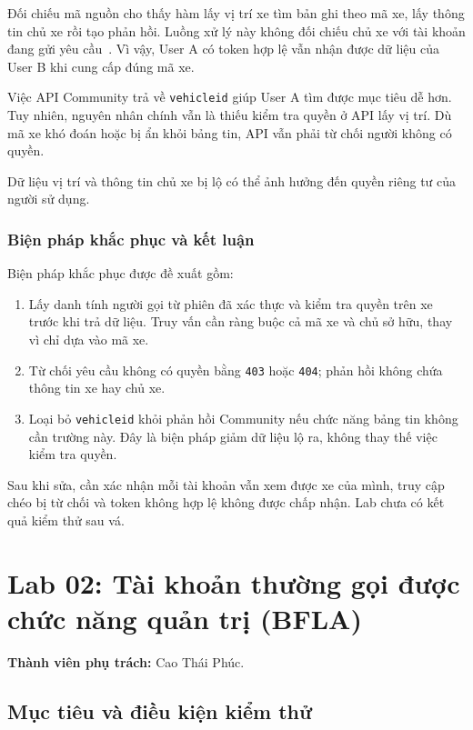 \documentclass[oneside,a4paper,12pt]{extreport}
\begin{document}
Đối chiếu mã nguồn cho thấy hàm lấy vị trí xe tìm bản ghi theo mã xe,
lấy thông tin chủ xe rồi tạo phản hồi. Luồng xử lý này không đối chiếu
chủ xe với tài khoản đang gửi yêu cầu~\cite{crapi-vehicle}. Vì vậy, User A có token hợp lệ
vẫn nhận được dữ liệu của User B khi cung cấp đúng mã xe.

Việc API Community trả về \texttt{vehicleid} giúp User A tìm được mục
tiêu dễ hơn. Tuy nhiên, nguyên nhân chính vẫn là thiếu kiểm tra quyền
ở API lấy vị trí. Dù mã xe khó đoán hoặc bị ẩn khỏi bảng tin, API vẫn
phải từ chối người không có quyền.

Dữ liệu vị trí và thông tin chủ xe bị lộ có thể ảnh hưởng đến quyền
riêng tư của người sử dụng.

\subsubsection{Biện pháp khắc phục và kết luận}

Biện pháp khắc phục được đề xuất gồm:
\begin{enumerate}
    \item Lấy danh tính người gọi từ phiên đã xác thực và kiểm tra quyền
    trên xe trước khi trả dữ liệu. Truy vấn cần ràng buộc cả mã xe và
    chủ sở hữu, thay vì chỉ dựa vào mã xe.
    \item Từ chối yêu cầu không có quyền bằng \texttt{403} hoặc
    \texttt{404}; phản hồi không chứa thông tin xe hay chủ xe.
    \item Loại bỏ \texttt{vehicleid} khỏi phản hồi Community nếu chức
    năng bảng tin không cần trường này. Đây là biện pháp giảm dữ liệu
    lộ ra, không thay thế việc kiểm tra quyền.
\end{enumerate}

Sau khi sửa, cần xác nhận mỗi tài khoản vẫn xem được xe của mình,
truy cập chéo bị từ chối và token không hợp lệ không được chấp nhận.
Lab chưa có kết quả kiểm thử sau vá.

\clearpage
\section{Lab 02: Tài khoản thường gọi được chức năng quản trị (BFLA)}
\label{chap:lab02}

\noindent\textbf{Thành viên phụ trách:} Cao Thái Phúc.

\subsection{Mục tiêu và điều kiện kiểm thử}
\end{document}
